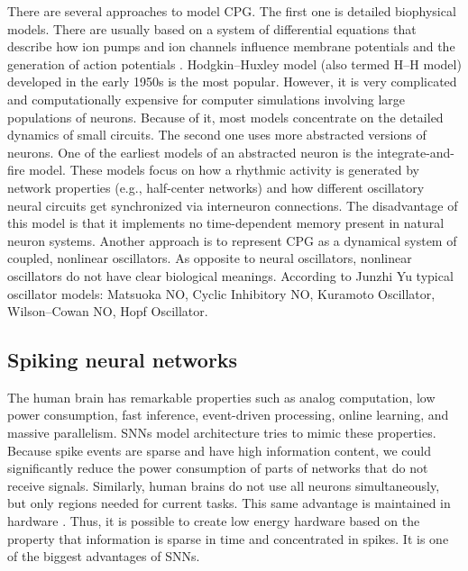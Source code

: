 \documentclass[runningheads]{llncs}
\begin{document}
There are several approaches to model CPG. The first one is detailed biophysical models. There are usually based on a system of differential equations that describe how ion pumps and ion channels influence membrane potentials and the generation of action potentials \cite{ref2} \cite{ref3} \cite{ref4}. Hodgkin–Huxley model \cite{ref1_2}(also termed H–H model) developed in the early 1950s is the most popular. However, it is very complicated and computationally expensive for computer simulations involving large populations of neurons. Because of it, most models concentrate on the detailed dynamics of small circuits. The second one uses more abstracted versions of neurons. One of the earliest models of an abstracted neuron is the integrate-and-fire model\cite{ref5}\cite{ref6}. These models focus on how a rhythmic activity is generated by network properties (e.g., half-center networks) and how different oscillatory neural circuits get synchronized via interneuron connections. The disadvantage of this model is that it implements no time-dependent memory present in natural neuron systems. Another approach is to represent CPG as a dynamical system of coupled, nonlinear oscillators. As opposite to neural oscillators, nonlinear oscillators do not have clear biological meanings. According to Junzhi Yu\cite{ref7} typical oscillator models: Matsuoka NO, Cyclic Inhibitory NO, Kuramoto Oscillator, Wilson–Cowan NO, Hopf Oscillator. \cite{ref8} \cite{ref9}



\subsection{Spiking neural networks}
The human brain has remarkable properties such as analog computation, low power consumption, fast inference, event-driven processing, online learning, and massive parallelism. SNNs model architecture tries to mimic these properties. Because spike events are sparse and have high information content, we could significantly reduce the power consumption of parts of networks that do not receive signals. \cite{ref13}  Similarly, human brains do not use all neurons simultaneously, but only regions needed for current tasks. This same advantage is maintained in hardware \cite{ref14} \cite{ref15}. Thus, it is possible to create low energy hardware based on the property that information is sparse in time and concentrated in spikes. It is one of the biggest advantages of SNNs.
\end{document}
